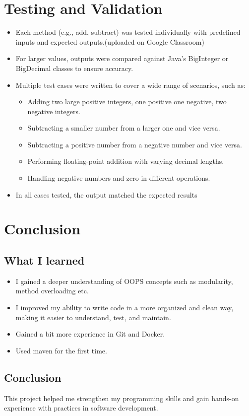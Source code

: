 \documentclass[12pt]{article}
\begin{document}
\begin{spacing}{1.2}
\section{Testing and Validation}
\begin{itemize}
    \item Each method (e.g., add, subtract) was tested individually with predefined inputs and expected outputs.(uploaded on Google Classroom)
    \item For larger values, outputs were compared against Java’s BigInteger or BigDecimal classes to ensure accuracy.
    \item Multiple test cases were written to cover a wide range of scenarios, such as:
    \begin{itemize}
        \item Adding two large positive integers, one positive one negative, two negative integers.
        \item Subtracting a smaller number from a larger one and vice versa.
        \item Subtracting a positive number from a negative number and vice versa.
        \item Performing floating-point addition with varying decimal lengths.
        \item Handling negative numbers and zero in different operations.
    \end{itemize}
    \item In all cases tested, the output matched the expected results
\end{itemize}

\section{Conclusion}
\subsection{What I learned}
\begin{itemize}
    \item I gained a deeper understanding of OOPS concepts such as modularity, method overloading etc.
    \item I improved my ability to write code in a more organized and clean way, making it easier to understand, test, and maintain.
    \item Gained a bit more experience in Git and Docker.
    \item Used maven for the first time.
\end{itemize}
\subsection{Conclusion}
This project helped me strengthen my programming skills and gain hands-on experience with practices in software development.

\end{spacing}
\end{document}
